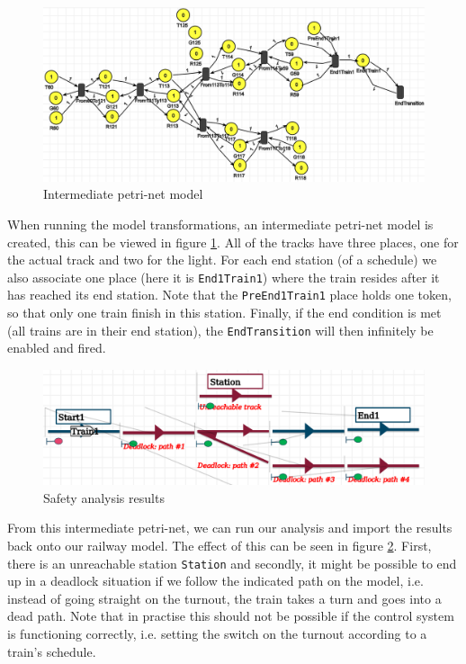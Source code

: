 \documentclass{article}
\begin{document}
\begin{figure}[H]
    \centering
    \includegraphics[width=\textwidth]{images/example_pn_pn.png}
    \caption{Intermediate petri-net model}
    \label{example_pn_pn}
\end{figure}

When running the model transformations, an intermediate petri-net model is created, this can be viewed in figure \ref{example_pn_pn}. All of the tracks have three places, one for the actual track and two for the light. For each end station (of a schedule) we also associate one place (here it is \texttt{End1Train1}) where the train resides after it has reached its end station. Note that the \texttt{PreEnd1Train1} place holds one token, so that only one train finish in this station. Finally, if the end condition is met (all trains are in their end station), the \texttt{EndTransition} will then infinitely be enabled and fired.

\begin{figure}[H]
    \centering
    \includegraphics[width=\textwidth]{images/example_pn_results.png}
    \caption{Safety analysis results}
    \label{example_pn_results}
\end{figure}

From this intermediate petri-net, we can run our analysis and import the results back onto our railway model. The effect of this can be seen in figure \ref{example_pn_results}. First, there is an unreachable station \texttt{Station} and secondly, it might be possible to end up in a deadlock situation if we follow the indicated path on the model, i.e. instead of going straight on the turnout, the train takes a turn and goes into a dead path. Note that in practise this should not be possible if the control system is functioning correctly, i.e. setting the switch on the turnout according to a train's schedule.
\end{document}
